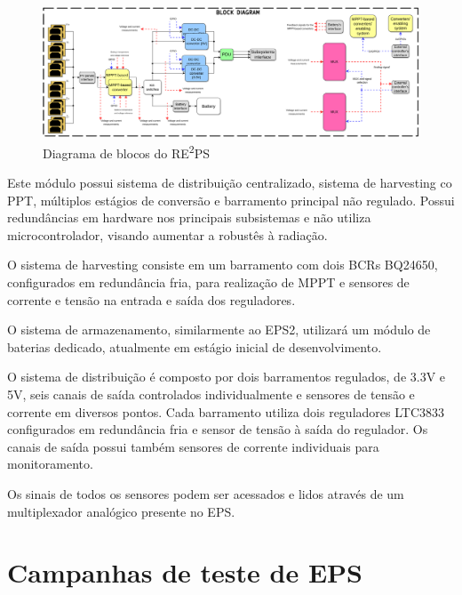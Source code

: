 \begin{figure}[htp]
    \caption{Diagrama de blocos do RE\textsuperscript{2}PS}
    \begin{center}
        \includegraphics[width=\textwidth, keepaspectratio]{images/reeps-block-diagram.png}
    \end{center}
    \label{fig:reeps-diagrama-blocos}
\end{figure}

Este módulo possui sistema de distribuição centralizado, sistema de harvesting co \gls{PPT}, múltiplos estágios de conversão e barramento principal não regulado.
Possui redundâncias em hardware nos principais subsistemas e não utiliza microcontrolador, visando aumentar a robustês à radiação.

O sistema de harvesting consiste em um barramento com dois \gls{BCR}s BQ24650, configurados em redundância fria, para realização de \gls{MPPT} e sensores de corrente e tensão na entrada e saída dos reguladores.

O sistema de armazenamento, similarmente ao \gls{EPS2}, utilizará um módulo de baterias dedicado, atualmente em estágio inicial de desenvolvimento.

O sistema de distribuição é composto por dois barramentos regulados, de 3.3V e 5V, seis canais de saída controlados individualmente e sensores de tensão e corrente em diversos pontos.
Cada barramento utiliza dois reguladores LTC3833 configurados em redundância fria e sensor de tensão à saída do regulador. Os canais de saída possui também sensores de corrente individuais para monitoramento.

Os sinais de todos os sensores podem ser acessados e lidos através de um multiplexador analógico presente no \gls{EPS}.





\section{Campanhas de teste de EPS}\label{sec:testes-epss}

